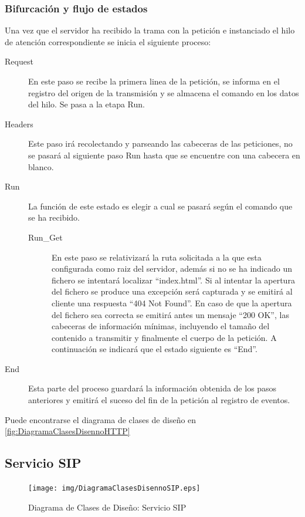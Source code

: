 \documentclass[a4paper,spanish,12pt]{book}
\begin{document}
\subsubsection{Bifurcación y flujo de estados} 
Una vez que el servidor ha recibido la trama con la petición e instanciado el hilo de atención correspondiente se inicia el siguiente proceso:
\begin{description}
	\item[Request] En este paso se recibe la primera linea de la petición, se informa en el registro del origen de la transmisión y se almacena el comando en los datos del hilo. Se pasa a la etapa Run.
	\item[Headers] Este paso irá recolectando y parseando las cabeceras de las peticiones, no se pasará al siguiente paso Run hasta que se encuentre con una cabecera en blanco.
	\item[Run] La función de este estado es elegir a cual se pasará según el comando que se ha recibido.
	\begin{description}
		\item[Run\_Get] En este paso se relativizará la ruta solicitada a la que esta configurada como raiz del servidor, además si no se ha indicado un fichero se intentará localizar ``index.html''. Si al intentar la apertura del fichero se produce una excepción será capturada y se emitirá al cliente una respuesta ``404 Not Found''. En caso de que la apertura del fichero sea correcta se emitirá antes un mensaje ``200 OK'', las cabeceras de información mínimas, incluyendo el tamaño del contenido a transmitir y finalmente el cuerpo de la petición. A continuación se indicará que el estado siguiente es ``End''.
	\end{description}
	\item[End] Esta parte del proceso guardará la información obtenida de los pasos anteriores y emitirá el suceso del fin de la petición al registro de eventos.
\end{description}
Puede encontrarse el diagrama de clases de diseño en \ref{fig:DiagramaClasesDisennoHTTP} 
\subsection{Servicio SIP}
\begin{figure}[h]
		\begin{center}
				\texttt{[image: img/DiagramaClasesDisennoSIP.eps]}	
			\end{center}
			\caption{Diagrama de Clases de Diseño: Servicio SIP}
			  \label{fig:DiagramaClasesDisennoSIP}
\end{figure}
\end{document}
